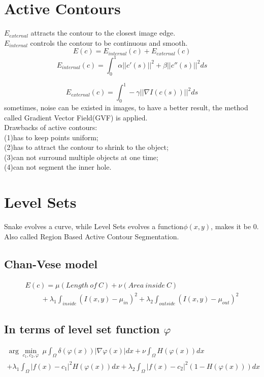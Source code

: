 \documentclass{article}
\begin{document}
\tableofcontents
\newpage
\section{Active Contours}
$E_{external}$ attracts the contour to the closest image edge.\\
$E_{internal}$ controls the contour to be continuous and smooth.
\begin{equation}\label{key}
E(c)=E_{internal}(c)+E_{external}(c)
\end{equation}
$$
E_{internal}(c)=\int_{0}^{1}\alpha||c'(s)||^2+\beta||c''(s)||^2ds
$$

$$
E_{external}(c)=\int_{0}^{1}-\gamma||\nabla I(c(s))||^2ds
$$
sometimes, noise can be existed in images, to have a better result, the method called Gradient Vector Field(GVF) is applied.\\
Drawbacks of active contours:\\
(1)has to keep points uniform;\\
(2)has to attract the contour to shrink to the object;\\
(3)can not surround multiple objects at one time;\\
(4)can not segment the inner hole.
\section{Level Sets}
Snake evolves a curve, while Level Sets evolves a function$\phi(x,y)$, makes it be 0.\\
Also called Region Based Active Contour Segmentation.
\subsection{Chan-Vese model}
\begin{equation}\label{key}
\begin{array}{ll}
E(c)=\mu(Length\ of\ C)+\nu(Area\ inside\ C)
\\\qquad\ +\lambda_1\int_{inside}(I(x,y)-\mu_{in})^2+\lambda_2\int_{outside}(I(x,y)-\mu_{out})^2
\end{array}
\end{equation}
\subsection{In terms of level set function $\varphi$}
\begin{multline}\label{key}
\arg\min_{c_1,c_2,\varphi} \ \mu\int_{\Omega}\delta(\varphi(x))|\nabla\varphi(x)|dx+\nu\int_{\Omega}H(\varphi(x))dx\\
+\lambda_1\int_{\Omega}|f(x)-c_1|^2H(\varphi(x))dx+\lambda_2\int_{\Omega}|f(x)-c_2|^2(1-H(\varphi(x)))dx
\end{multline}
\end{document}
